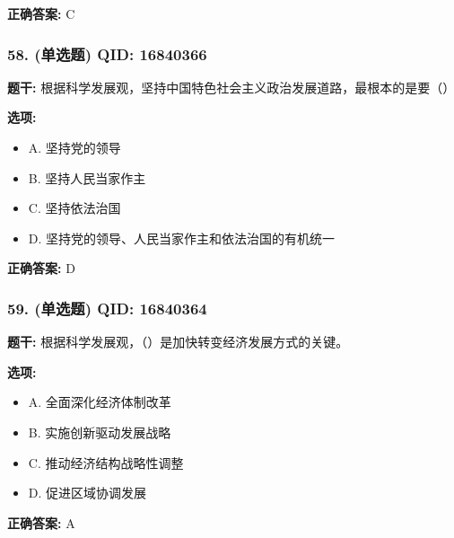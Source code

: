\documentclass[12pt,UTF8]{ctexart}
\begin{document}
\textbf{正确答案:}
C

\vspace{0.3em}\hrulefill\vspace{0.7em}

\subsubsection*{58. (单选题) \small QID: 16840366}

\textbf{题干:}
根据科学发展观，坚持中国特色社会主义政治发展道路，最根本的是要（）

\textbf{选项:}
\begin{itemize}[leftmargin=*]

  \item A. 坚持党的领导

  \item B. 坚持人民当家作主

  \item C. 坚持依法治国

  \item D. 坚持党的领导、人民当家作主和依法治国的有机统一

\end{itemize}

\textbf{正确答案:}
D

\vspace{0.3em}\hrulefill\vspace{0.7em}

\subsubsection*{59. (单选题) \small QID: 16840364}

\textbf{题干:}
根据科学发展观，（）是加快转变经济发展方式的关键。

\textbf{选项:}
\begin{itemize}[leftmargin=*]

  \item A. 全面深化经济体制改革

  \item B. 实施创新驱动发展战略

  \item C. 推动经济结构战略性调整

  \item D. 促进区域协调发展

\end{itemize}

\textbf{正确答案:}
A

\vspace{0.3em}\hrulefill\vspace{0.7em}
\end{document}
